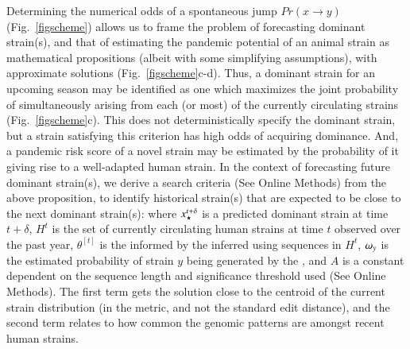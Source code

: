 \documentclass[onecolumn, compsoc,10pt]{IEEEtran}
\def\METHODS{Online Methods\xspace}
\begin{document}
Determining the numerical odds of a spontaneous jump $ Pr(x \rightarrow y)$ (Fig.~\ref{figscheme}) allows us to frame the problem of forecasting  dominant strain(s), and that of estimating the  pandemic potential of an animal strain as  mathematical propositions (albeit with some simplifying assumptions), with  approximate solutions (Fig.~\ref{figscheme}c-d). Thus,  a dominant strain for an upcoming  season may be identified as one which maximizes the joint probability of simultaneously arising from each (or most)  of the currently circulating strains (Fig.~\ref{figscheme}c).  This does not deterministically specify the dominant strain, but a strain satisfying this criterion  has  high odds of acquiring dominance. And, a pandemic risk score of a novel strain may be estimated by the probability of it giving rise to a well-adapted human strain. In the context of  forecasting  future dominant strain(s),  we derive a search criteria (See \METHODS) from the above proposition, to identify  historical strain(s) that are  expected to be close to the next dominant strain(s):
%
%
where $x_\star^{t+\delta}$ is a predicted dominant strain  at time $t+\delta$, $H^t$ is the set of currently circulating human strains at time $t$  observed over the past year, $\theta^{[t]}$ is the \qdist informed by the inferred \enet using sequences in $H^t$, $\omega_{y}$ is the estimated probability of strain $y$ being generated by the \enet, and $A$ is a constant dependent on the sequence length and significance threshold used (See \METHODS). The first term gets the solution close to the centroid of the current strain distribution (in the \qdist metric, and not the standard edit distance), and the second term relates to how common the genomic patterns are amongst recent human strains. 
\end{document}
